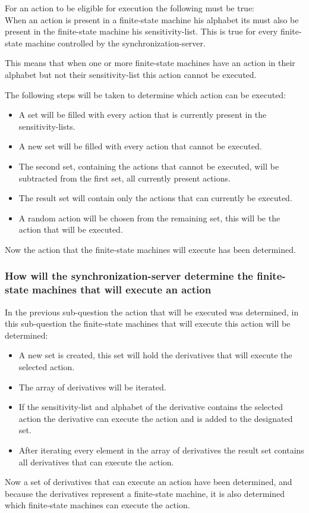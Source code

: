 For an action to be eligible for execution the following must be true:\\
When an action is present in a finite-state machine his alphabet its
must also be present in the finite-state machine his sensitivity-list.
This is true for every finite-state machine controlled by the
synchronization-server.

This means that when one or more finite-state machines have an action in
their alphabet but not their sensitivity-list this action cannot be
executed.

The following steps will be taken to determine which action can be
executed:

\begin{itemize}
\tightlist
\item
  A set will be filled with every action that is currently present in
  the sensitivity-lists.
\item
  A new set will be filled with every action that cannot be executed.
\item
  The second set, containing the actions that cannot be executed, will
  be subtracted from the first set, all currently present actions.
\item
  The result set will contain only the actions that can currently be
  executed.
\item
  A random action will be chosen from the remaining set, this will be
  the action that will be executed.
\end{itemize}

Now the action that the finite-state machines will execute has been
determined.

\hypertarget{how-will-the-synchronization-server-determine-the-finite-state-machines-that-will-execute-an-action}{%
\subsubsection{How will the synchronization-server determine the
finite-state machines that will execute an
action}\label{how-will-the-synchronization-server-determine-the-finite-state-machines-that-will-execute-an-action}}

In the previous sub-question the action that will be executed was
determined, in this sub-question the finite-state machines that will
execute this action will be determined:

\begin{itemize}
\tightlist
\item
  A new set is created, this set will hold the derivatives that will
  execute the selected action.
\item
  The array of derivatives will be iterated.
\item
  If the sensitivity-list and alphabet of the derivative contains the
  selected action the derivative can execute the action and is added to
  the designated set.
\item
  After iterating every element in the array of derivatives the result
  set contains all derivatives that can execute the action.
\end{itemize}

Now a set of derivatives that can execute an action have been
determined, and because the derivatives represent a finite-state
machine, it is also determined which finite-state machines can execute
the action.
